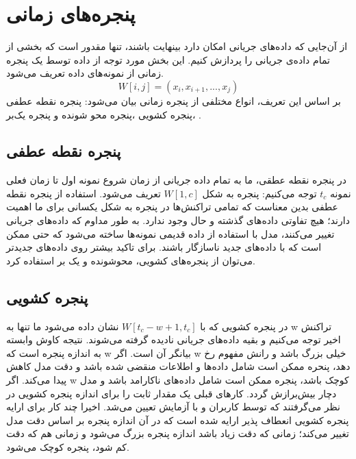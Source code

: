\section{پنجره‌های زمانی}
از آن‌جایی که داده‌های جریانی امکان دارد بینهایت باشند، تنها مقدور است که بخشی از تمام داده‌ی جریانی را پردازش کنیم. این بخش مورد توجه از داده توسط یک پنجره زمانی از نمونه‌های داده تعریف می‌شود.
\begin{equation}
W[i, j] = (x_i, x_{i+1}, ..., x_j)
\end{equation}
بر اساس این تعریف، انواع مختلفی از پنجره زمانی بیان‌ می‌شود: پنجره نقطه عطفی
،پنجره کشویی
،پنجره محو شونده
و پنجره یک‌بر
.

\subsection{پنجره نقطه عطفی}
در پنجره نقطه عطقی، ما به تمام داده جریانی از زمان شروع نمونه اول تا زمان فعلی نمونه $ t_c $ توجه می‌کنیم: پنجره به شکل $ W[1, c] $ تعریف می‌شود\cite{domingos2000mining}. استفاده از پنجره نقطه عطفی بدین معناست که تمامی تراکنش‌ها در پنجره به شکل یکسانی برای ما اهمیت دارند؛ هیچ تفاوتی داده‌های گذشته و حال وجود ندارد. به طور مداوم که داده‌های جریانی تغییر می‌کنند، مدل با استفاده از داده قدیمی نمونه‌ها ساخته می‌شود که حتی ممکن است که با داده‌های جدید ناسازگار باشند. برای تاکید بیشتر روی داده‌های جدیدتر می‌توان از پنجره‌های کشویی، محوشونده و یک بر استفاده کرد.

\subsection{پنجره کشویی}
   در پنجره کشویی که با
$W[t_c - w + 1, t_c]$
 نشان داده می‌شود ما تنها به w تراکنش اخیر توجه می‌کنیم و بقیه داده‌های جریانی نادیده گرفته‌ می‌شوند\cite{nguyen2012heterogeneous}. نتیجه کاوش وابسته به اندازه پنجره است که w بیانگر آن است. اگر w خیلی بزرگ باشد و رانش مفهوم رخ دهد، پنحره ممکن است شامل داده‌‌ها و اطلاعات منقضی شده باشد و دقت مدل کاهش پیدا می‌کند. اگر w کوچک باشد، پنجره ممکن است شامل داده‌های ناکارامد باشد و مدل دچار بیش‌برازش گردد.
کارهای قبلی یک مقدار ثابت را برای اندازه پنجره کشویی در نظر‌ می‌گرفتند که توسط کاربران و با آزمایش تعیین می‌شد. اخیرا چند کار \cite{bifet2010adaptive} برای ارایه پنجره کشویی انعطاف پذیر ارایه شده است که در آن اندازه پنجره بر اساس دقت مدل تغییر می‌کند؛ زمانی که دقت زیاد باشد اندازه پنجره بزرگ می‌شود و زمانی هم که دقت کم شود، پنجره کوچک می‌شود.


